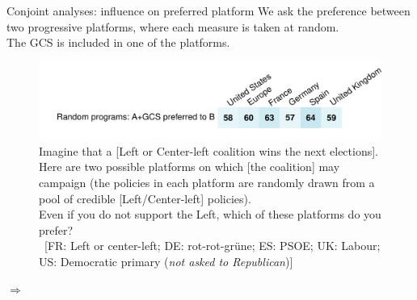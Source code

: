 \begin{framefont}{\small}
\begin{frame}{Conjoint analyses: influence on preferred platform\label{}} 
    \bbvs \ip We ask the preference between two progressive platforms, where each measure is taken at random. \\ The GCS is included in one of the platforms.
    \ee
    \begin{figure} \vspace*{-.3cm}
        \centering 
        \caption{Imagine that a [Left or Center-left coalition wins the next elections]. Here are two possible platforms on which [the coalition] may campaign (the policies in each platform are randomly drawn from a pool of credible [Left/Center-left] policies).
		\\ Even if you do not support the Left, which of these platforms do you prefer? 
		\\ ~[FR: Left or center-left; DE: rot-rot-grüne; ES: PSOE; UK: Labour; US: Democratic primary (\textit{not asked to Republican})]
		}
        \vspace{-.2cm} 
        \includegraphics[height=.4\textheight]{../figures/country_comparison/conjoint_left_ag_b_binary_positive.pdf} 
    \end{figure}
    $\Rightarrow$ 
\end{frame}


\end{framefont}
